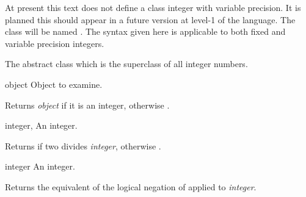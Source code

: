 \begin{optDefinition}
\begin{note}
    At present this text does not define a class integer with variable
    precision.  It is planned this should appear in a future version at level-1
    of the language.  The class will be named
    .  The syntax given here is applicable
    to both fixed and variable precision integers.
\end{note}

%
The abstract class which is the superclass of all integer numbers.

%
\begin{arguments}
    \item[object] Object to examine.
\end{arguments}
%
\result
Returns {\em object} if it is an integer, otherwise \nil{}.

%
\begin{arguments}
    \item[integer, \classref{integer}] An integer.
\end{arguments}
%
\result
Returns \true\/ if two divides {\em integer}, otherwise \nil{}.

%
\begin{arguments}
    \item[integer] An integer.
\end{arguments}
%
\result
Returns the equivalent of the logical negation of  applied to
{\em integer}.
%
\end{optDefinition}
